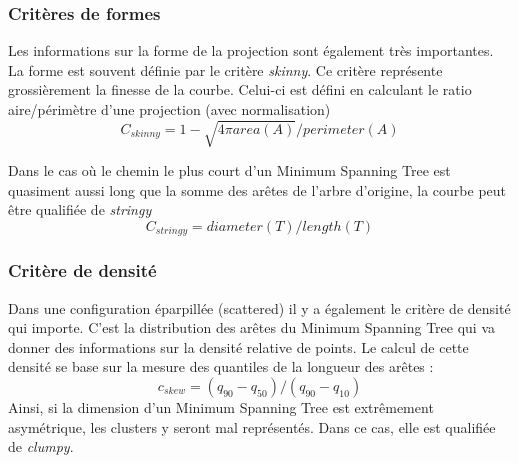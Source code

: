 \subsubsection{Critères de formes}

Les informations sur la forme de la projection sont également très importantes.\cite{wilkinson2005graph-MST}
La forme est souvent définie par le critère \textit{skinny}. Ce critère représente grossièrement la
finesse de la courbe. Celui-ci est défini en calculant le ratio aire/périmètre d’une projection
(avec normalisation) \[ C_{skinny} = 1 - \sqrt{4\pi area(A)}/perimeter(A) \]

Dans le cas où le chemin le plus court d’un Minimum Spanning Tree est quasiment aussi
long que la somme des arêtes de l’arbre d’origine, la courbe peut être qualifiée de \textit{stringy} \[C_{stringy} = diameter(T)/length(T) \]

\subsubsection{Critère de densité}
Dans une configuration éparpillée (scattered) il y a également le critère de densité qui
importe. C’est la distribution des arêtes du Minimum Spanning Tree qui va donner des
informations sur la densité relative de points.
Le calcul de cette densité se base sur la mesure des quantiles de la longueur des arêtes : 
\[c_{skew} = (q_{90}-q_{50})/(q_{90}-q_{10})\]
Ainsi, si la dimension d’un Minimum Spanning Tree est extrêmement asymétrique, les
clusters y seront mal représentés. Dans ce cas, elle est qualifiée de \textit{clumpy}. \cite{wilkinson2005graph-MST}


